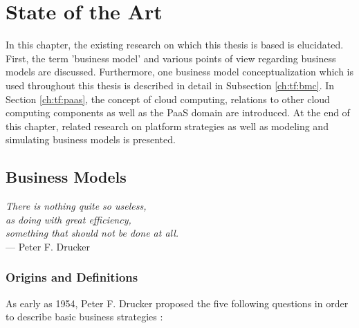 \chapter{State of the Art}\label{ch:tf}%


In this chapter, the existing research on which this thesis is based is elucidated. First, the term 'business model' and various points of view regarding business models are discussed. Furthermore, one business model conceptualization which is used throughout this thesis is described in detail in Subsection \ref{ch:tf:bmc}. In Section \ref{ch:tf:paas}, the concept of cloud computing, relations to other cloud computing components as well as the \ac{PaaS} domain are introduced. At the end of this chapter, related research on platform strategies as well as modeling and simulating business models is presented.

\section{Business Models}\label{ch:tf:bm}

\begin{flushright}{\slshape    
	There is nothing quite so useless,\\
	as doing with great efficiency, \\
	something that should not be done at all.} \\ \medskip
	--- Peter F. Drucker
\end{flushright}

\vspace*{-18pt}

\subsection{Origins and Definitions}

As early as 1954, Peter F. Drucker proposed the five following questions in order to describe basic business strategies \citep[pp. 49-61]{Drucker1954}:

